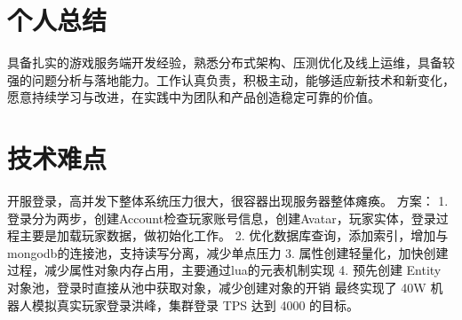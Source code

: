 \documentclass{resume}
\begin{document}
\section{个人总结}
具备扎实的游戏服务端开发经验，熟悉分布式架构、压测优化及线上运维，具备较强的问题分析与落地能力。工作认真负责，积极主动，能够适应新技术和新变化，愿意持续学习与改进，在实践中为团队和产品创造稳定可靠的价值。

\section{技术难点}
开服登录，高并发下整体系统压力很大，很容器出现服务器整体瘫痪。
方案：
1. 登录分为两步，创建Account检查玩家账号信息，创建Avatar，玩家实体，登录过程主要是加载玩家数据，做初始化工作。
2. 优化数据库查询，添加索引，增加与mongodb的连接池，支持读写分离，减少单点压力
3. 属性创建轻量化，加快创建过程，减少属性对象内存占用，主要通过lua的元表机制实现
4. 预先创建 Entity 对象池，登录时直接从池中获取对象，减少创建对象的开销
最终实现了 40W 机器人模拟真实玩家登录洪峰，集群登录 TPS 达到 4000 的目标。


\end{document}
